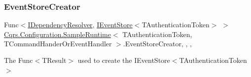 \subsubsection{\texorpdfstring{Event\+Store\+Creator}{EventStoreCreator}}
{\footnotesize\ttfamily Func$<$\hyperlink{interfaceCqrs_1_1Configuration_1_1IDependencyResolver}{I\+Dependency\+Resolver}, \hyperlink{interfaceCqrs_1_1Events_1_1IEventStore}{I\+Event\+Store}$<$T\+Authentication\+Token$>$ $>$ \hyperlink{classCqrs_1_1Configuration_1_1SampleRuntime}{Cqrs.\+Configuration.\+Sample\+Runtime}$<$ T\+Authentication\+Token, T\+Command\+Hander\+Or\+Event\+Handler $>$.Event\+Store\+Creator\hspace{0.3cm}{\ttfamily [static]}, {\ttfamily [get]}, {\ttfamily [set]}, {\ttfamily [protected]}}



The Func$<$\+T\+Result$>$ used to create the I\+Event\+Store$<$\+T\+Authentication\+Token$>$ 

